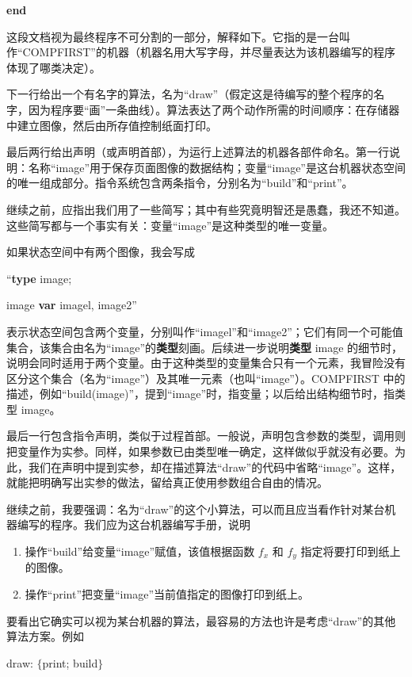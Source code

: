 \textbf{end}

这段文档视为最终程序不可分割的一部分，解释如下。它指的是一台叫作“COMPFIRST”的机器（机器名用大写字母，并尽量表达为该机器编写的程序体现了哪类决定）。

下一行给出一个有名字的算法，名为“draw”（假定这是待编写的整个程序的名字，因为程序要“画”一条曲线）。算法表达了两个动作所需的时间顺序：在存储器中建立图像，然后由所存值控制纸面打印。

最后两行给出声明（或声明首部），为运行上述算法的机器各部件命名。第一行说明：名称“image”用于保存页面图像的数据结构；变量“image”是这台机器状态空间的唯一组成部分。指令系统包含两条指令，分别名为“build”和“print”。

继续之前，应指出我们用了一些简写；其中有些究竟明智还是愚蠢，我还不知道。这些简写都与一个事实有关：变量“image”是这种类型的唯一变量。

如果状态空间中有两个图像，我会写成

\noindent
``\textbf{type} image;

\noindent
image \textbf{var} imagel, image2''

\noindent
表示状态空间包含两个变量，分别叫作“imagel”和“image2”；它们有同一个可能值集合，该集合由名为“image”的\textbf{类型}刻画。后续进一步说明\textbf{类型} image 的细节时，说明会同时适用于两个变量。由于这种类型的变量集合只有一个元素，我冒险没有区分这个集合（名为“image”）及其唯一元素（也叫“image”）。COMPFIRST 中的描述，例如“build(image)”，提到“image”时，指变量；以后给出结构细节时，指类型 image。

最后一行包含指令声明，类似于过程首部。一般说，声明包含参数的类型，调用则把变量作为实参。同样，如果参数已由类型唯一确定，这样做似乎就没有必要。为此，我们在声明中提到实参，却在描述算法“draw”的代码中省略“image”。这样，就能把明确写出实参的做法，留给真正使用参数组合自由的情况。

继续之前，我要强调：名为“draw”的这个小算法，可以而且应当看作针对某台机器编写的程序。我们应为这台机器编写手册，说明
\begin{enumerate}[wide, nosep, label=(\arabic*)]
	\item 操作“build”给变量“image”赋值，该值根据函数 $f_x$ 和 $f_y$ 指定将要打印到纸上的图像。

	\item 操作“print”把变量“image”当前值指定的图像打印到纸上。
\end{enumerate}

要看出它确实可以视为某台机器的算法，最容易的方法也许是考虑“draw”的其他算法方案。例如

draw: $\{$print; build$\}$

